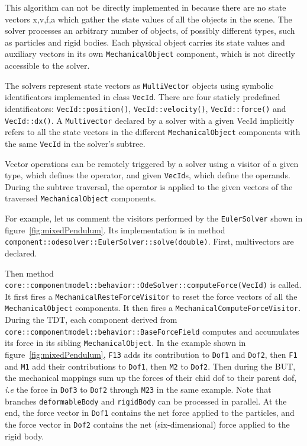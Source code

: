 This algorithm can not be directly implemented in \sofa because there are no state vectors x,v,f,a which gather the state values of all the objects in the scene. 
The solver processes an arbitrary number of objects, of possibly different types, such as particles and rigid bodies. Each physical object carries its state values and auxiliary vectors in its own \texttt{MechanicalObject} component, which is not directly accessible to the solver.

The solvers represent state vectors as \texttt{MultiVector} objects using symbolic identificators implemented in class \texttt{VecId}.
There are four staticly predefined identificators: \texttt{VecId::position()}, \texttt{VecId::velocity()}, \texttt{VecId::force()} and \texttt{VecId::dx()}.
A \texttt{Multivector} declared by a solver with a given VecId implicitly refers to all the state vectors in the different \texttt{MechanicalObject} components with the same \texttt{VecId} in the solver's subtree.

Vector operations can be remotely triggered by a solver using a visitor of a given type, which defines the operator, and given \texttt{VecId}s, which define the operands.
During the subtree traversal, the operator is applied to the given vectors of the traversed \texttt{MechanicalObject} components.

For example, let us comment the visitors performed by the \texttt{EulerSolver} shown in figure~\ref{fig:mixedPendulum}. Its implementation is in method \texttt{component::odesolver::EulerSolver::solve(double)}.
First, multivectors are declared. 

Then method \texttt{core::componentmodel::behavior::OdeSolver::computeForce(VecId)} is called. It first fires a \texttt{MechanicalResteForceVisitor} to reset the force vectors of all the \texttt{MechanicalObject} components. It then fires a  \texttt{MechanicalComputeForceVisitor}. During the TDT, each component derived from \texttt{core::componentmodel::behavior::BaseForceField} computes and accumulates its force in its sibling \texttt{MechanicalObject}. In the example shown in figure~\ref{fig:mixedPendulum}, \texttt{F13} adds its contribution to \texttt{Dof1} and \texttt{Dof2}, then \texttt{F1} and \texttt{M1} add their contributions to \texttt{Dof1}, then \texttt{M2} to \texttt{Dof2}. Then during the BUT, the mechanical mappings sum up the forces of their chid dof to their parent dof, \textit{i.e} the force in \texttt{Dof3} to \texttt{Dof2} through \texttt{M23} in the same example. 
Note that branches \texttt{deformableBody} and \texttt{rigidBody} can be processed in parallel.
At the end, the force vector in \texttt{Dof1} contains the net force applied to the particles, and the force vector in \texttt{Dof2} contains the net (six-dimensional) force applied to the rigid body. 

